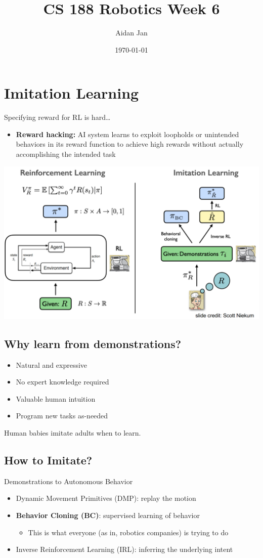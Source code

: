 \documentclass[10pt]{article}
\title{CS 188 Robotics Week 6}
\author{Aidan Jan}
\date{\today}
\begin{document}
\maketitle 

\section*{Imitation Learning}
Specifying reward for RL is hard\dots
\begin{itemize}
	\item \textbf{Reward hacking:} AI system learns to exploit loopholds or unintended behaviors in its reward function to achieve high rewards without actually accomplishing the intended task
\end{itemize}
\begin{center} 
	\includegraphics*[width=\textwidth]{L1_1.png} 
\end{center}

\subsection*{Why learn from demonstrations?}
\begin{itemize}
	\item Natural and expressive
	\item No expert knowledge required
	\item Valuable human intuition
	\item Program new tasks as-needed
\end{itemize}
Human babies imitate adults when to learn.

\subsection*{How to Imitate?}
Demonstrations to Autonomous Behavior
\begin{itemize}
	\item Dynamic Movement Primitives (DMP): replay the motion
	\item \textbf{Behavior Cloning (BC)}: supervised learning of behavior
	\begin{itemize}
        \item This is what everyone (as in, robotics companies) is trying to do
    \end{itemize}
	\item Inverse Reinforcement Learning (IRL): inferring the underlying intent
\end{itemize}
\end{document}
